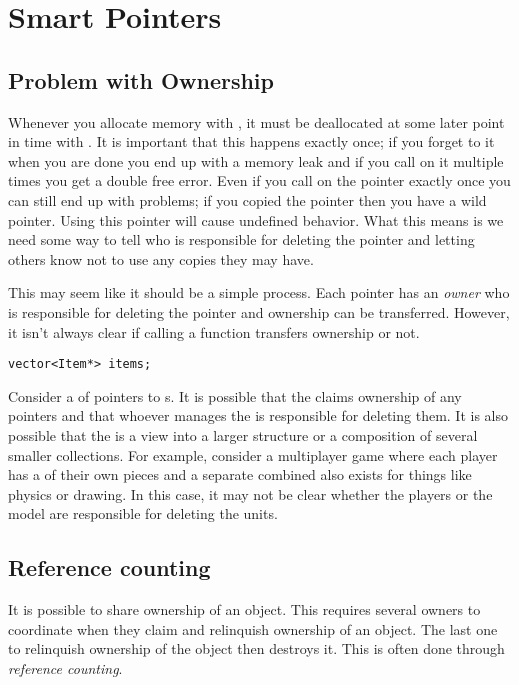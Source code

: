 \chapter{Smart Pointers}\label{ch:SmartPointers}

\section{Problem with Ownership}\label{ch:ProblemControl}

Whenever you allocate memory with , it must be deallocated at some later point in time with .
It is important that this happens exactly once;
if you forget to  it when you are done you end up with a memory leak and if you call  on it multiple times you get a double free error.
Even if you call  on the pointer exactly once you can still end up with problems;
if you copied the pointer then you have a wild pointer.
Using this pointer will cause undefined behavior.
What this means is we need some way to tell who is responsible for deleting the pointer and letting others know not to use any copies they may have.

This may seem like it should be a simple process.
Each pointer has an \emph{owner} who is responsible for deleting the pointer and ownership can be transferred.
However, it isn't always clear if calling a function transfers ownership or not.

\begin{lstlisting}
vector<Item*> items;
\end{lstlisting}

Consider a \vectortype of pointers to s.
It is possible that the \vectortype claims ownership of any pointers and that whoever manages the \vectortype is responsible for deleting them.
It is also possible that the \vectortype is a view into a larger structure or a composition of several smaller collections.
For example, consider a multiplayer game where each player has a \vectortype of their own pieces and a separate combined \vectortype also exists for things like physics or drawing.
In this case, it may not be clear whether the players or the model are responsible for deleting the units.


\section{Reference counting}\label{ch:ReferenceCounting}

It is possible to share ownership of an object.
This requires several owners to coordinate when they claim and relinquish ownership of an object.
The last one to relinquish ownership of the object then destroys it.
This is often done through \emph{reference counting}.

